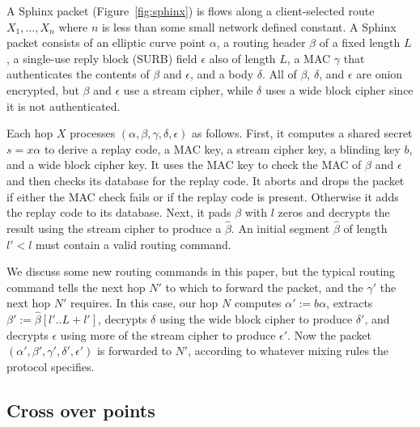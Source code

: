 \documentclass[twoside,letterpaper]{llncs}
\begin{document}
A Sphinx packet (Figure~\ref{fig:sphinx}) is flows along a client-selected route $X_1,\ldots,X_n$
where $n$ is less than some small network defined constant.  A Sphinx
packet consists of an elliptic curve point $\alpha$, a routing header
$\beta$ of a fixed length $L$, a single-use reply block (SURB) field
$\epsilon$ also of length $L$, a MAC $\gamma$ that authenticates the
contents of $\beta$ and $\epsilon$, and a body $\delta$.  All of
$\beta$, $\delta$, and $\epsilon$ are onion encrypted, but $\beta$ and
$\epsilon$ use a stream cipher, while $\delta$ uses a wide block
cipher since it is not authenticated.


Each hop $X$ processes $(\alpha,\beta,\gamma,\delta,\epsilon)$
as follows.  First, it computes a shared secret $s = x \alpha$ to
derive a replay code, a MAC key, a stream cipher key, 
 a blinding key $b$, and a wide block cipher key. 
It uses the MAC key to check the MAC of $\beta$ and $\epsilon$ and
 then checks its database for the replay code.
It aborts and drops the packet if either the MAC check fails or
 if the replay code is present.  Otherwise it adds the replay code
 to its database.
Next, it pads $\beta$ with $l$ zeros and decrypts the result
 using the stream cipher to produce a $\hat\beta$.
An initial segment $\hat\beta$ of length $l' < l$ must contain
a valid routing command.  

We discuss some new routing commands in this paper, but the typical
routing command tells the next hop $N'$ to which to forward the
packet, and the $\gamma'$ the next hop $N'$ requires. 
In this case, our hop $N$ computes $\alpha' := b \alpha$,
extracts $\beta' := \hat\beta[l'..L+l']$,
decrypts $\delta$ using the wide block cipher
 to produce $\delta'$, and
decrypts $\epsilon$ using more of the stream cipher
 to produce $\epsilon'$.
Now the packet $(\alpha',\beta',\gamma',\delta',\epsilon')$ is
forwarded to $N'$,
 according to whatever mixing rules the protocol specifies.


\subsection{Cross over points}

\end{document}
